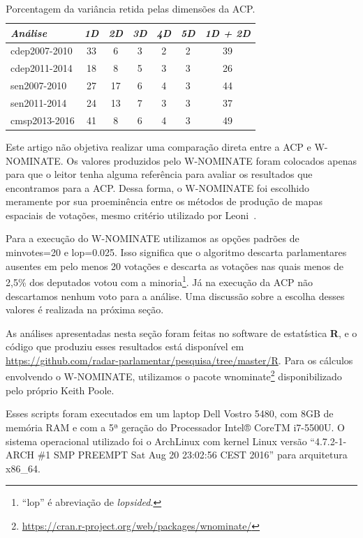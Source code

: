 \documentclass[a4paper, 12pt]{article}
\newcommand\wnominate{W-NOMINATE\xspace}
\begin{document}
\begin{table}
\centering
\begin{tabular}{l c c c c c | c}
\itshape Análise & \itshape 1D & \itshape 2D & \itshape 3D & \itshape 4D & \itshape 5D & \itshape 1D + 2D \\
\hline
cdep2007-2010 & 33 &  6 & 3 & 2 & 2 & 39  \\ 
cdep2011-2014 & 18 &  8 & 5 & 3 & 3 & 26  \\ 
sen2007-2010  & 27 & 17 & 6 & 4 & 3 & 44  \\ 
sen2011-2014  & 24 & 13 & 7 & 3 & 3 & 37  \\ 
cmsp2013-2016 & 41 &  8 & 6 & 4 & 3 & 49  \\ 
\end{tabular} 
\caption{Porcentagem da variância retida pelas dimensões da ACP.}
\label{tab:variacao-explicada-acp}
\end{table}

Este artigo não objetiva realizar uma comparação direta entre a ACP e \wnominate. Os valores produzidos pelo \wnominate foram colocados apenas para que o leitor tenha alguma referência para avaliar os resultados que encontramos para a ACP. Dessa forma, o \wnominate foi escolhido meramente por sua proeminência entre os métodos de produção de mapas espaciais de votações, mesmo critério utilizado por Leoni~\cite{leoni02cdep}.

Para a execução do \wnominate utilizamos as opções padrões de \textsf{minvotes=20} e \textsf{lop=0.025}. Isso significa que o algoritmo descarta parlamentares ausentes em pelo menos 20 votações e descarta as votações nas quais menos de 2,5\% dos deputados votou com a minoria\footnote{``lop'' é abreviação de \emph{lopsided}.}. Já na execução da ACP não descartamos nenhum voto para a análise. Uma discussão sobre a escolha desses valores é realizada na próxima seção.

As análises apresentadas nesta seção foram feitas no software de estatística \textbf{R}, e o código que produziu esses resultados está disponível em \url{https://github.com/radar-parlamentar/pesquisa/tree/master/R}. Para os cálculos envolvendo o \wnominate, utilizamos o pacote \textsf{wnominate}\footnote{\url{https://cran.r-project.org/web/packages/wnominate/}} disponibilizado pelo próprio Keith Poole.

Esses scripts foram executados em um laptop Dell Vostro 5480, com 8GB de memória RAM e com a 5ª geração do Processador Intel® CoreTM i7-5500U. O sistema operacional utilizado foi o ArchLinux com kernel Linux  versão ``4.7.2-1-ARCH \#1 SMP PREEMPT Sat Aug 20 23:02:56 CEST 2016'' para arquitetura x86\_64. 
\end{document}
